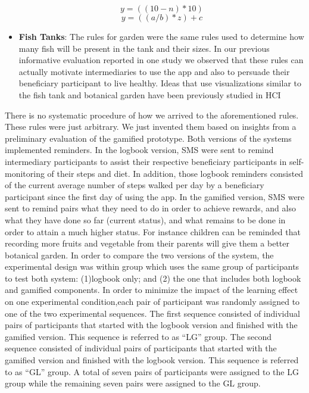 \documentclass{sig-alternate}
\begin{document}
\begin{itemize}
\begin{equation}
\label{equation:numtrees}
y=((10-n)*10) 
\end{equation}
\begin{equation}
\label{equation:sizetrees}
y=((a/b)*z)+c 
\end{equation}
\item{\textbf{Fish Tanks}}: The rules for garden were the same rules used to determine how many fish will be present in the tank and their sizes. In our previous informative evaluation reported in one study we observed that these rules can actually motivate  intermediaries to use the app and also to persuade their beneficiary participant to live healthy. Ideas that use visualizations similar to the fish tank and botanical garden have been previously studied in HCI \cite{klasnja2009:using,lin2006:fish}
\end{itemize} 
There is no systematic procedure of how we arrived to the aforementioned rules. These rules were just arbitrary.  We just invented them based on insights from a preliminary evaluation of the gamified prototype.\newline
Both versions of the systems implemented reminders. In the logbook version, SMS were sent to remind intermediary participants to assist their respective beneficiary participants in self-monitoring of their steps and diet. In addition, those logbook reminders consisted of the current average number of steps walked per day by a beneficiary participant since the first day of using the app. In the gamified version, SMS were sent to remind pairs what they need to do in order to achieve rewards, and also what they have done so far (current status), and what remains to be done in order to attain a much higher status. For instance children can be reminded that recording more fruits and vegetable from their parents will give them a better botanical garden.\newline    
In order to compare the two versions of the system, the experimental design was within group which uses the same group of participants to test both system: (1)logbook only; and (2) the one that includes both logbook and gamified components. In order to minimize the impact of the learning effect on one experimental condition,each pair of participant was randomly assigned to one of the two experimental sequences. The first sequence consisted of individual pairs of participants that started with the logbook version and finished with the gamified version. This sequence is referred to as ``LG'' group. The second sequence  consisted of individual pairs of participants that started with the gamified version and finished with the logbook version. This sequence is referred to as ``GL'' group. A total of seven pairs of participants were assigned to the LG group while the remaining seven pairs were assigned to the GL group. 
\end{document}

